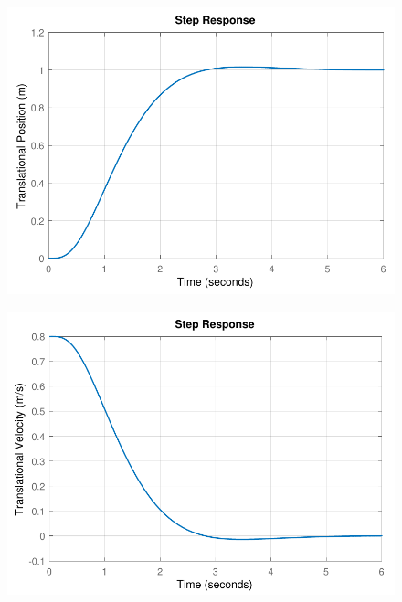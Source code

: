 \begin{minipage}{\linewidth}
    \begin{minipage}{0.5\linewidth}
        \begin{figure}[H]
            \includegraphics[scale=.55]{figures/stepPosition}
            \centering
            \label{fig:stepPosition}
        \end{figure}
    \end{minipage}
    \hspace{0.03\linewidth}
    \begin{minipage}{0.5\linewidth}
        \begin{figure}[H] 
            \includegraphics[scale=.55]{figures/stepPositionControlAction}
            \centering
            \label{fig:stepPositionControlAction}
        \end{figure}
    \end{minipage}
\end{minipage}
%


